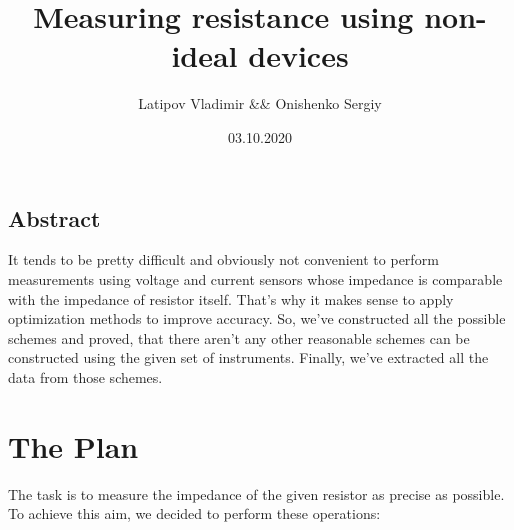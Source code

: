 \documentclass[11pt]{memoir}
\title{\textbf{\Huge{Measuring resistance using non-ideal devices}}}
\date{03.10.2020}
\author{Latipov Vladimir \&\& Onishenko Sergiy}
\begin{document}
    \renewcommand{\thesection}{\arabic{section}}

    \maketitle
    \newpage

    \tableofcontents

    \newpage


    \begin{vplace}
    \begin{center}

    \section{Abstract}\label{sec:abstract}
            It tends to be pretty difficult and obviously not convenient to perform measurements using voltage and current sensors whose impedance is comparable with the impedance of resistor itself.\newline
            That's why it makes sense to apply optimization methods to improve accuracy.\newline
            So, we've constructed all the possible schemes and proved, that there aren't any other reasonable schemes can be constructed using the given set of instruments.\newline
            Finally, we've extracted all the data from those schemes.\newline

    \end{center}
    \end{vplace}

    \newpage

    \section{The Plan}\label{sec:the-plan}
        The task is to measure the impedance of the given resistor as precise as possible.\newline
        To achieve this aim, we decided to perform these operations:\newline
\end{document}
